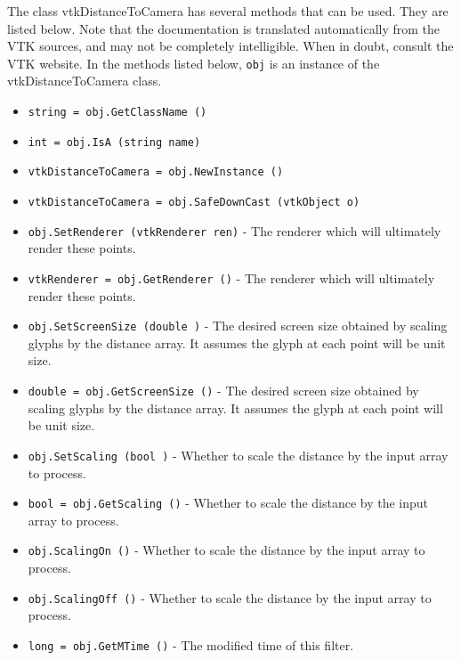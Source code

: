 The class vtkDistanceToCamera has several methods that can be used.
  They are listed below.
Note that the documentation is translated automatically from the VTK sources,
and may not be completely intelligible.  When in doubt, consult the VTK website.
In the methods listed below, \verb|obj| is an instance of the vtkDistanceToCamera class.
\begin{itemize}
\item  \verb|string = obj.GetClassName ()|

\item  \verb|int = obj.IsA (string name)|

\item  \verb|vtkDistanceToCamera = obj.NewInstance ()|

\item  \verb|vtkDistanceToCamera = obj.SafeDownCast (vtkObject o)|

\item  \verb|obj.SetRenderer (vtkRenderer ren)| -  The renderer which will ultimately render these points.

\item  \verb|vtkRenderer = obj.GetRenderer ()| -  The renderer which will ultimately render these points.

\item  \verb|obj.SetScreenSize (double )| -  The desired screen size obtained by scaling glyphs by the distance
 array. It assumes the glyph at each point will be unit size.

\item  \verb|double = obj.GetScreenSize ()| -  The desired screen size obtained by scaling glyphs by the distance
 array. It assumes the glyph at each point will be unit size.

\item  \verb|obj.SetScaling (bool )| -  Whether to scale the distance by the input array to process.

\item  \verb|bool = obj.GetScaling ()| -  Whether to scale the distance by the input array to process.

\item  \verb|obj.ScalingOn ()| -  Whether to scale the distance by the input array to process.

\item  \verb|obj.ScalingOff ()| -  Whether to scale the distance by the input array to process.

\item  \verb|long = obj.GetMTime ()| -  The modified time of this filter.

\end{itemize}
